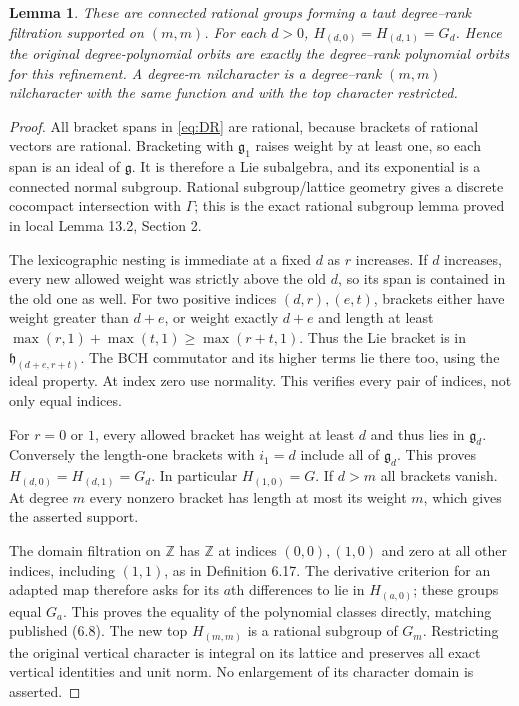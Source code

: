 \documentclass[11pt]{article}
\newtheorem{lemma}{Lemma}\newtheorem{theorem}[lemma]{Theorem}
\newcommand{\Z}{\mathbb Z}\newcommand{\N}{\mathbb N}
\begin{document}
\begin{lemma}\label{lem:DR}
These are connected rational groups forming a taut degree--rank
filtration supported on $(m,m)$. For each $d>0$,
$H_{(d,0)}=H_{(d,1)}=G_d$. Hence the original degree-polynomial orbits
are exactly the degree--rank polynomial orbits for this refinement.
A degree-$m$ nilcharacter is a degree--rank $(m,m)$ nilcharacter
with the same function and with the top character restricted.
\end{lemma}
\begin{proof}
All bracket spans in \eqref{eq:DR} are rational, because brackets of
rational vectors are rational. Bracketing with $\mathfrak g_1$ raises
weight by at least one, so each span is an ideal of $\mathfrak g$.
It is therefore a Lie subalgebra, and its exponential is a connected
normal subgroup. Rational subgroup/lattice geometry gives a discrete
cocompact intersection with $\Gamma$; this is the exact rational
subgroup lemma proved in local Lemma 13.2, Section 2.

The lexicographic nesting is immediate at a fixed $d$ as $r$ increases.
If $d$ increases, every new allowed weight was strictly above the old
$d$, so its span is contained in the old one as well. For two positive
indices $(d,r),(e,t)$, brackets either have weight greater than $d+e$,
or weight exactly $d+e$ and length at least
$\max(r,1)+\max(t,1)\geq\max(r+t,1)$. Thus the Lie bracket is in
$\mathfrak h_{(d+e,r+t)}$. The BCH commutator and its higher terms
lie there too, using the ideal property. At index zero use normality.
This verifies every pair of indices, not only equal indices.

For $r=0$ or $1$, every allowed bracket has weight at least $d$ and
thus lies in $\mathfrak g_d$. Conversely the length-one brackets with
$i_1=d$ include all of $\mathfrak g_d$. This proves
$H_{(d,0)}=H_{(d,1)}=G_d$. In particular $H_{(1,0)}=G$.
If $d>m$ all brackets vanish. At degree $m$ every nonzero bracket has
length at most its weight $m$, which gives the asserted support.

The domain filtration on $\Z$ has $\Z$ at indices $(0,0),(1,0)$
and zero at all other indices, including $(1,1)$, as in Definition 6.17.
The derivative criterion for an adapted
map therefore asks for its $a$th differences to lie in $H_{(a,0)}$;
these groups equal $G_a$. This proves the equality of the polynomial
classes directly, matching published (6.8). The new top
$H_{(m,m)}$ is a rational subgroup of $G_m$. Restricting the original
vertical character is integral on its lattice and preserves all exact
vertical identities and unit norm. No enlargement of its character
domain is asserted.
\end{proof}
\end{document}
